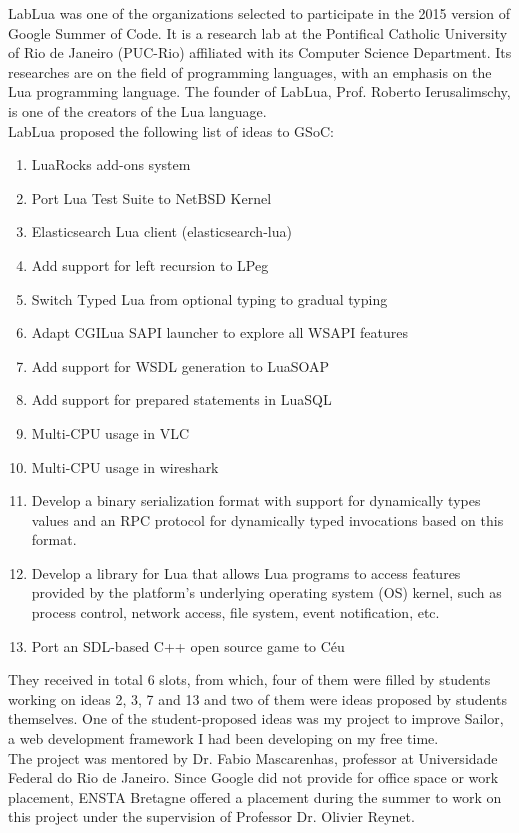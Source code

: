 \documentclass{article}
\begin{document}
LabLua was one of the organizations selected to participate in the 2015 version of Google Summer of Code. It is a research lab at the Pontifical Catholic University of Rio de Janeiro (PUC-Rio) affiliated with its Computer Science Department. Its researches are on the field of programming languages, with an emphasis on the Lua programming language. The founder of LabLua, Prof. Roberto Ierusalimschy, is one of the creators of the Lua language.\\

LabLua proposed the following list of ideas to GSoC: 

\begin{enumerate}\item LuaRocks add-ons system
\item Port Lua Test Suite to NetBSD Kernel
\item Elasticsearch Lua client (elasticsearch-lua)
\item Add support for left recursion to LPeg
\item Switch Typed Lua from optional typing to gradual typing
\item Adapt CGILua SAPI launcher to explore all WSAPI features
\item Add support for WSDL generation to LuaSOAP
\item Add support for prepared statements in LuaSQL
\item Multi-CPU usage in VLC
\item Multi-CPU usage in wireshark
\item Develop a binary serialization format with support for dynamically types values and an RPC protocol for dynamically typed invocations based on this format.
\item Develop a library for Lua that allows Lua programs to access features provided by the platform's underlying operating system (OS) kernel, such as process control, network access, file system, event notification, etc.
\item Port an SDL-based C++ open source game to Céu
\end{enumerate}

They received in total 6 slots, from which, four of them were filled by students working on ideas 2, 3, 7 and 13 and two of them were ideas proposed by students themselves. One of the student-proposed ideas was my project to improve Sailor, a web development framework I had been developing on my free time. \\

The project was mentored by Dr. Fabio Mascarenhas, professor at Universidade Federal do Rio de Janeiro. Since Google did not provide for office space or work placement, ENSTA Bretagne offered a placement during the summer to work on this project under the supervision of Professor Dr. Olivier Reynet. \\
\end{document}
